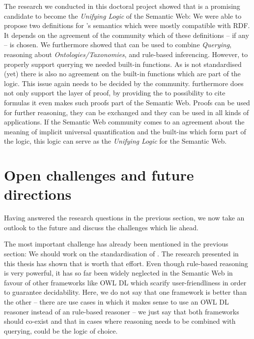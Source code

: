 The research we conducted in this doctoral project showed that \nthreelogic is a promising candidate to become the \emph{Unifying Logic} of the Semantic Web:
We were able to propose two definitions for \nthree's semantics which were mostly compatible with RDF. It depends on the agreement of the community which 
of these definitions -- if any -- is chosen.
We furthermore showed that \nthree can be used to combine \emph{Querying}, reasoning about \emph{Ontologies/Taxonomies}, and rule-based inferencing. 
However, to properly support querying we  needed 
built-in functions. As \nthree is not standardised (yet) there is also no agreement on the built-in functions which are part of the logic. This  issue again 
needs to be decided by the community. 
\nthree  furthermore does not only support the layer of proof, by providing the to possibility to cite formulas it even makes such proofs part of the Semantic Web.
Proofs can be used for further reasoning, they can be exchanged and they can be used in all kinds of applications.
If the Semantic Web community comes to an agreement about the meaning of implicit universal quantification and the built-ins which form part of the logic, this logic 
can serve as the \emph{Unifying Logic} for the Semantic Web.




\section{Open challenges and future directions}
Having answered the research questions in the previous section, we now take an outlook to the future and discuss the challenges which lie ahead. 

The most important challenge 
has already been mentioned in the previous section: We should work on the standardisation of \nthree.
The research presented in this thesis has shown that \nthree is worth that effort. 
Even though rule-based reasoning is very powerful, it has so far been widely neglected in the Semantic Web in favour of other frameworks like OWL DL which 
scarify user-friendliness in order to guarantee decidability. %
Here, we do not say that one framework is better than the other -- there are use cases in which it makes sense to use an OWL DL reasoner instead of an 
rule-based reasoner -- we just say that both frameworks should co-exist and that in cases where reasoning needs to be combined with querying, \nthree could be 
the logic of choice. 

